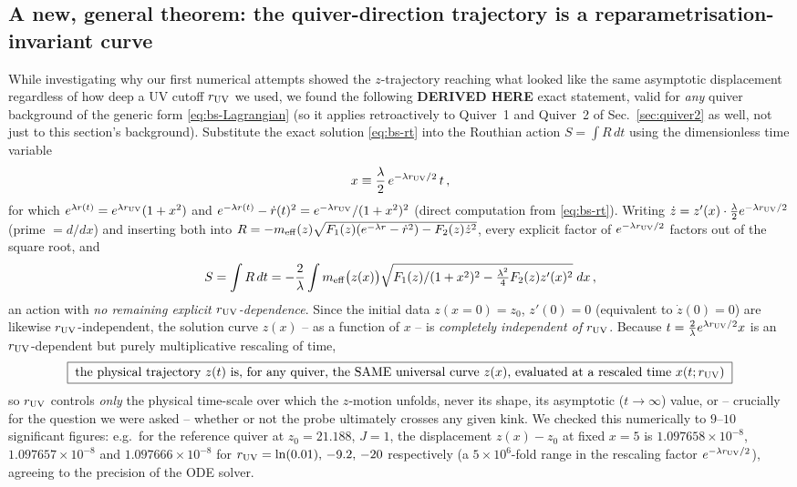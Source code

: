 \documentclass[11pt]{article}
\begin{document}
\subsection{A new, general theorem: the quiver-direction trajectory is a reparametrisation-invariant curve}
\label{subsec:bs-theorem}

While investigating why our first numerical attempts showed the $z$-trajectory reaching what looked like the same asymptotic displacement regardless of how deep a UV cutoff $r_{\rm UV}$ we used, we found the following \textbf{DERIVED HERE} exact statement, valid for \emph{any} quiver background of the generic form \eqref{eq:bs-Lagrangian} (so it applies retroactively to Quiver~1 and Quiver~2 of Sec.~\ref{sec:quiver2} as well, not just to this section's background). Substitute the exact solution \eqref{eq:bs-rt} into the Routhian action $S=\int R\,dt$ using the dimensionless time variable
\begin{equation}
x \equiv \frac\lambda2\,e^{-\lambda r_{\rm UV}/2}\,t\,,
\end{equation}
for which $e^{\lambda r(t)}=e^{\lambda r_{\rm UV}}(1+x^2)$ and $e^{-\lambda r(t)}-\dot r(t)^2 = e^{-\lambda r_{\rm UV}}/(1+x^2)^2$ (direct computation from \eqref{eq:bs-rt}). Writing $\dot z=z'(x)\cdot\frac\lambda2e^{-\lambda r_{\rm UV}/2}$ (prime $=d/dx$) and inserting both into $R=-m_{\rm eff}(z)\sqrt{F_1(z)(e^{-\lambda r}-\dot r^2)-F_2(z)\dot z^2}$, every explicit factor of $e^{-\lambda r_{\rm UV}/2}$ factors out of the square root, and
\begin{equation}
S=\int R\,dt = -\frac2\lambda\int m_{\rm eff}\big(z(x)\big)\sqrt{F_1(z)/(1+x^2)^2-\tfrac{\lambda^2}4F_2(z)z'(x)^2}\;dx\,,
\end{equation}
an action with \emph{no remaining explicit $r_{\rm UV}$-dependence}. Since the initial data $z(x{=}0)=z_0$, $z'(0)=0$ (equivalent to $\dot z(0)=0$) are likewise $r_{\rm UV}$-independent, the solution curve $z(x)$ -- as a function of $x$ -- is \emph{completely independent of $r_{\rm UV}$}. Because $t=\frac2\lambda e^{\lambda r_{\rm UV}/2}x$ is an $r_{\rm UV}$-dependent but purely multiplicative rescaling of time,
\begin{equation}
\boxed{\;
\text{the physical trajectory } z(t) \text{ is, for any quiver, the SAME universal curve } z(x)\text{, evaluated at a rescaled time }x(t;r_{\rm UV})\;}
\label{eq:bs-theorem}
\end{equation}
so $r_{\rm UV}$ controls \emph{only} the physical time-scale over which the $z$-motion unfolds, never its shape, its asymptotic ($t\to\infty$) value, or -- crucially for the question we were asked -- whether or not the probe ultimately crosses any given kink. We checked this numerically to $9$--$10$ significant figures: e.g.\ for the reference quiver at $z_0=21.188$, $J=1$, the displacement $z(x)-z_0$ at fixed $x=5$ is $1.097658\times10^{-8}$, $1.097657\times10^{-8}$ and $1.097666\times10^{-8}$ for $r_{\rm UV}=\ln(0.01),\,-9.2,\,-20$ respectively (a $5\times10^6$-fold range in the rescaling factor $e^{-\lambda r_{\rm UV}/2}$), agreeing to the precision of the ODE solver.
\end{document}
